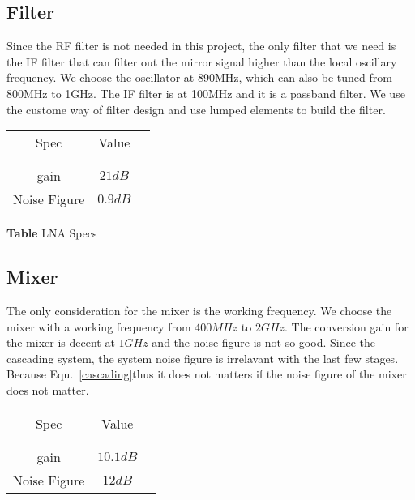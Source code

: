 \documentclass[]{article}
\begin{document}
    \subsection{Filter}
        Since the RF filter is not needed in this project, the only filter that
        we need is the IF filter that can filter out the mirror signal higher
        than the local oscillary frequency. We choose the oscillator at 890MHz,
        which can also be tuned from 800MHz to 1GHz. The IF filter is at 100MHz
        and it is a passband filter. We use the custome way of filter design and
        use lumped elements to build the filter.

        \begin{center}
            \begin{tabular}{c c c}
                Spec & Value \\ \\ \hline \\
                gain & $21dB$ \\
                Noise Figure & $0.9dB$ \\
            \end{tabular}
        \end{center}

        \begin{center}
            \textbf{Table} LNA Specs
        \end{center}

    \subsection{Mixer}
        The only consideration for the mixer is the working frequency. We choose
        the mixer with a working frequency from $400MHz$ to $2GHz$. The
        conversion gain for the mixer is decent at $1GHz$ and the noise figure
        is not so good. Since the cascading system, the system noise figure is
        irrelavant with the last few stages. Because Equ.~\ref{cascading}thus it
        does not matters if the noise figure of the mixer does not matter.

        \begin{center}
            \begin{tabular}{c c c}
                Spec & Value \\ \\ \hline \\
                gain & $10.1dB$ \\
                Noise Figure & $12dB$ \\
            \end{tabular}
        \end{center}
\end{document}
